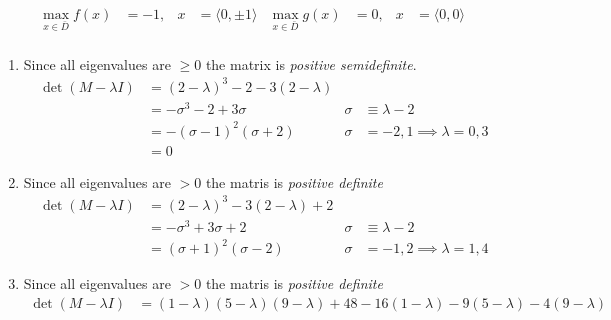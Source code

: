 \documentclass{article}
\begin{document}
\begin{tasks}
\begin{enumerate}
\begin{displaymath}
\begin{aligned}
                        \max_{x\in\bar{D}} f(x) &= -1, & x &= \langle 0, \pm1\rangle &
                        \max_{x\in\bar{D}} g(x) &= 0, & x &= \langle 0, 0\rangle \\
                    \end{aligned}
                  \end{displaymath}
        \end{enumerate}
        \item \begin{enumerate}
            \item Since all eigenvalues are \(\geq 0\) the matrix is \textit{positive semidefinite}.
            \begin{displaymath}
                \begin{aligned}
                    \det(M-\lambda I)
                    &= (2-\lambda)^3 - 2 - 3(2-\lambda) & \\
                    &= -\sigma^3-2+3\sigma & \sigma&\equiv\lambda-2 \\
                    &= -(\sigma-1)^2(\sigma+2) & \sigma &= -2, 1 \implies \boxed{\lambda = 0, 3} \\
                    &= 0 
                \end{aligned}
            \end{displaymath}
            \item Since all eigenvalues are \(> 0\) the matris is \textit{positive definite}
            \begin{displaymath}
                \begin{aligned}
                    \det(M-\lambda I)
                    &= (2-\lambda)^3 - 3(2-\lambda) + 2 & \\
                    &= -\sigma^3 + 3\sigma + 2 & \sigma&\equiv\lambda-2 \\
                    &= (\sigma + 1)^2(\sigma - 2) & \sigma&=-1, 2 \implies \boxed{\lambda=1, 4}
                \end{aligned}
            \end{displaymath}
            \item Since all eigenvalues are \(> 0\) the matris is \textit{positive definite}
            \begin{displaymath}
                \begin{aligned}
                    \det(M-\lambda I)
                    &= (1-\lambda)(5-\lambda)(9-\lambda)+48-16(1-\lambda)-9(5-\lambda)-4(9-\lambda) & \\

\end{aligned}
\end{displaymath}
\end{enumerate}
\end{tasks}
\end{document}
